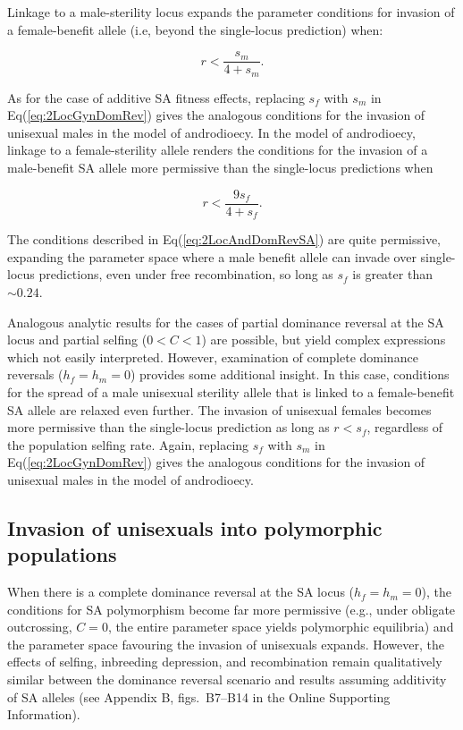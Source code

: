 \documentclass{article}
\begin{document}
Linkage to a male-sterility locus expands the parameter conditions for invasion of a female-benefit allele (i.e, beyond the single-locus prediction) when:

\begin{equation}\label{eq:2LocGynDomRevSA}
    r < \frac{s_m}{4 + s_m}.
\end{equation}

As for the case of additive SA fitness effects, replacing $s_f$ with $s_m$ in Eq(\ref{eq:2LocGynDomRev}) gives the analogous conditions for the invasion of unisexual males in the model of androdioecy. In the model of androdioecy, linkage to a female-sterility allele renders the conditions for the invasion of a male-benefit SA allele more permissive than the single-locus predictions when 

\begin{equation}\label{eq:2LocAndDomRevSA}
    r < \frac{9 s_f}{4 + s_f}.
\end{equation}

\noindent The conditions described in Eq(\ref{eq:2LocAndDomRevSA}) are quite permissive, expanding the parameter space where a male benefit allele can invade over single-locus predictions, even under free recombination, so long as $s_f$ is greater than $\sim 0.24$. 

Analogous analytic results for the cases of partial dominance reversal at the SA locus and partial selfing ($0 < C < 1$) are possible, but yield complex expressions which not easily interpreted. However, examination of complete dominance reversals ($h_f = h_m = 0$) provides some additional insight. In this case, conditions for the spread of a male unisexual sterility allele that is linked to a female-benefit SA allele are relaxed even further. The invasion of unisexual females becomes more permissive than the single-locus prediction as long as $r < s_f$, regardless of the population selfing rate. Again, replacing $s_f$ with $s_m$ in Eq(\ref{eq:2LocGynDomRev}) gives the analogous conditions for the invasion of unisexual males in the model of androdioecy.


\subsection*{Invasion of unisexuals into polymorphic populations}
When there is a complete dominance reversal at the SA locus ($h_f = h_m = 0$), the conditions for SA polymorphism become far more permissive (e.g., under obligate outcrossing, $C = 0$, the entire parameter space yields polymorphic equilibria) and the parameter space favouring the invasion of unisexuals expands. However, the effects of selfing, inbreeding depression, and recombination remain qualitatively similar between the dominance reversal scenario and results assuming additivity of SA alleles (see Appendix B, figs.~B7--B14 in the Online Supporting Information).
\end{document}

